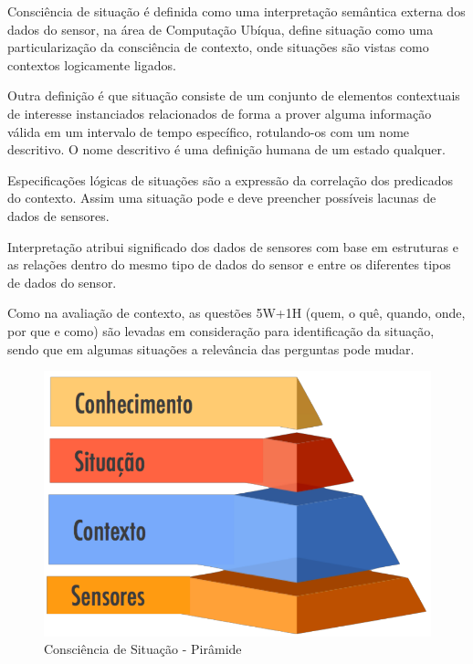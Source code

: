 \documentclass[12pt,a4paper,compsoc]{IEEEtran}
\begin{document}
  Consciência de situação é definida como uma interpretação semântica externa dos dados do sensor,
  na área de Computação Ubíqua, \cite{anagnostopoulos2006} define situação como uma 
  particularização da consciência de contexto, onde situações são vistas como contextos logicamente
  ligados.
  
  Outra definição é que situação consiste de um conjunto de elementos contextuais de interesse 
  instanciados relacionados de forma a prover alguma informação válida em um intervalo de tempo 
  específico, rotulando-os com um nome descritivo. O nome descritivo é uma definição humana de um 
  estado qualquer.
  
  Especificações lógicas de situações são a expressão da correlação dos predicados do contexto. 
  Assim uma situação pode e deve preencher possíveis lacunas de dados de sensores.
  
  Interpretação atribui significado dos dados de sensores com base em estruturas e as relações 
  dentro do mesmo tipo de dados do sensor e entre os diferentes tipos de dados do sensor.
  
  Como na  avaliação de contexto, as questões 5W+1H (quem, o quê, quando, onde, por que e como) são
  levadas em consideração para identificação da situação, sendo que em algumas situações a 
  relevância das perguntas pode mudar.
  
  \begin{figure}[t!]
    \centerline{\includegraphics[scale=.2]{imagens/consciencia-de-situacao-piramide}}
    \caption{Consciência de Situação - Pirâmide \cite{almeida2013}}
    \label{cs-piramide}
  \end{figure}
  
\end{document}
